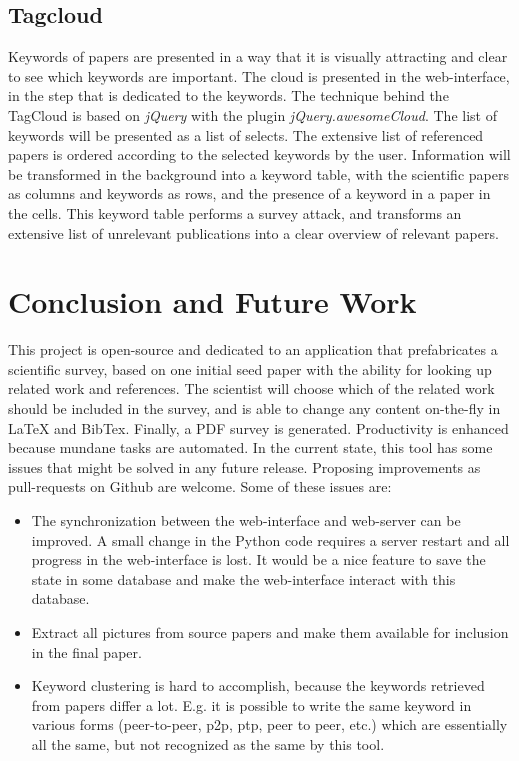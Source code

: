 \documentclass[12pt]{article}
\begin{document}
\subsection{Tagcloud}
Keywords of papers are presented in a way that it is visually attracting and clear to see which keywords are important. The cloud is presented in the web-interface, in the step that is dedicated to the keywords. The technique behind the TagCloud is based on \textit{jQuery} with the plugin \textit{jQuery.awesomeCloud}. The list of keywords will be presented as a list of selects. The extensive list of referenced papers is ordered according to the selected keywords by the user. Information will be transformed in the background into a keyword table, with the scientific papers as columns and keywords as rows, and the presence of a keyword in a paper in the cells. This keyword table performs a survey attack, and transforms an extensive list of unrelevant publications into a clear overview of relevant papers.

\section{Conclusion and Future Work}
This project is open-source and dedicated to an application that prefabricates a scientific survey, based on one initial seed paper with the ability for looking up related work and references. The scientist will choose which of the related work should be included in the survey, and is able to change any content on-the-fly in LaTeX and BibTex. Finally, a PDF survey is generated. Productivity is enhanced because mundane tasks are automated. In the current state, this tool has some issues that might be solved in any future release. Proposing improvements as pull-requests on Github are welcome. Some of these issues are:
\begin{itemize}
\item The synchronization between the web-interface and web-server can be improved. A small change in the Python code requires a server restart and all progress in the web-interface is lost. It would be a nice feature to save the state in some database and make the web-interface interact with this database.
\item Extract all pictures from source papers and make them available for inclusion in the final paper.
\item Keyword clustering is hard to accomplish, because the keywords retrieved from papers differ a lot. E.g. it is possible to write the same keyword in various forms (peer-to-peer, p2p, ptp, peer to peer, etc.) which are essentially all the same, but not recognized as the same by this tool.
\end{itemize}







\end{document}
